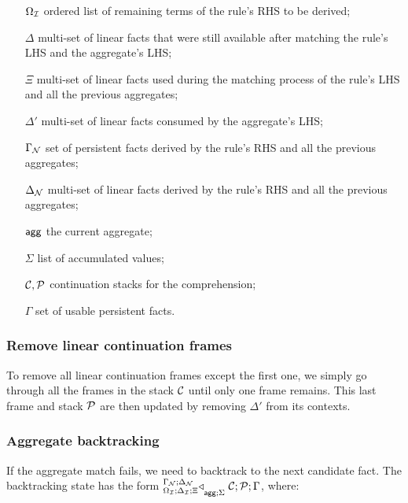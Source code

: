 \begin{enumerate}

   \item[$\Omega_{\mathcal{I}}$] ordered list of remaining terms of the rule's RHS to be
      derived;

   \item[$\Delta$] multi-set of linear facts that were still available after
   matching the rule's LHS and the aggregate's LHS;
   \item[$\Xi$] multi-set of linear facts used during the matching process of
   the rule's LHS and all the previous aggregates;
   \item[$\Delta'$] multi-set of linear facts consumed by the aggregate's LHS;

   \item[$\Gamma_{\mathcal{N}}$] set of persistent facts derived by the rule's RHS and all
      the previous aggregates;

   \item[$\Delta_{\mathcal{N}}$] multi-set of linear facts derived by the rule's RHS and
      all the previous aggregates;

   \item[$\mathsf{agg}$] the current aggregate;
   \item[$\Sigma$] list of accumulated values;
   \item[$\mathcal{C}, \mathcal{P}$] continuation stacks for the comprehension;
   \item[$\Gamma$] set of usable persistent facts.
\end{enumerate}

\subsubsection{Remove linear continuation frames}

To remove all linear continuation frames except the first one, we simply go
through all the frames in the stack $\mathcal{C}$ until only one frame remains.
This last frame and stack $\mathcal{P}$ are then updated by removing $\Delta'$
from its contexts.



\subsubsection{Aggregate backtracking}

If the aggregate match fails, we need to backtrack to the next candidate fact.
The backtracking state 
has the form
${{}^{\Gamma_{\mathcal{N}}; \Delta_{\mathcal{N}}}_{\Omega_{\mathcal{I}} ; \Delta_{\mathcal{I}} ; \Xi}\triangleleft}_{\mathsf{agg} ; \Sigma} \; \mathcal{C} ; \mathcal{P} ; \Gamma$, where:

